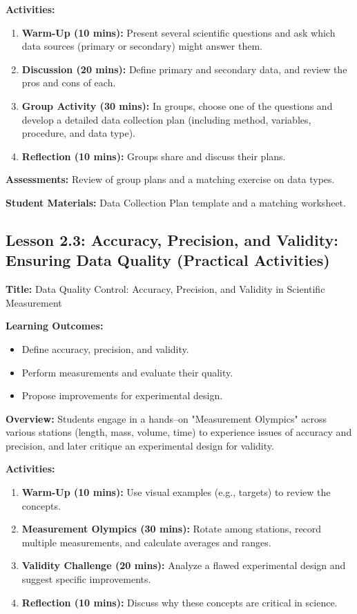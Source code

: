 \documentclass{tufte-book}
\begin{document}
\medskip
\textbf{Activities:}
\begin{enumerate}[label=\arabic*.]
    \item \textbf{Warm-Up (10 mins):} Present several scientific questions and ask which data sources (primary or secondary) might answer them.
    \item \textbf{Discussion (20 mins):} Define primary and secondary data, and review the pros and cons of each.
    \item \textbf{Group Activity (30 mins):} In groups, choose one of the questions and develop a detailed data collection plan (including method, variables, procedure, and data type).
    \item \textbf{Reflection (10 mins):} Groups share and discuss their plans.
\end{enumerate}

\medskip
\textbf{Assessments:}  
Review of group plans and a matching exercise on data types.

\medskip
\textbf{Student Materials:}  
Data Collection Plan template and a matching worksheet.

\subsection{Lesson 2.3: Accuracy, Precision, and Validity: Ensuring Data Quality (Practical Activities)}
\textbf{Title:} Data Quality Control: Accuracy, Precision, and Validity in Scientific Measurement

\medskip
\textbf{Learning Outcomes:}
\begin{itemize}[leftmargin=*, label={\textbullet}]
    \item Define accuracy, precision, and validity.
    \item Perform measurements and evaluate their quality.
    \item Propose improvements for experimental design.
\end{itemize}

\medskip
\textbf{Overview:}  
Students engage in a hands--on "Measurement Olympics" across various stations (length, mass, volume, time) to experience issues of accuracy and precision, and later critique an experimental design for validity.

\medskip
\textbf{Activities:}
\begin{enumerate}[label=\arabic*.]
    \item \textbf{Warm-Up (10 mins):} Use visual examples (e.g., targets) to review the concepts.
    \item \textbf{Measurement Olympics (30 mins):} Rotate among stations, record multiple measurements, and calculate averages and ranges.
    \item \textbf{Validity Challenge (20 mins):} Analyze a flawed experimental design and suggest specific improvements.
    \item \textbf{Reflection (10 mins):} Discuss why these concepts are critical in science.
\end{enumerate}
\end{document}
